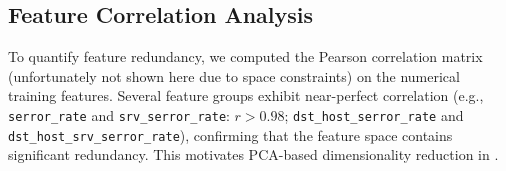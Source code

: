 \subsection{Feature Correlation Analysis} \label{sec:correlation}

    To quantify feature redundancy, we computed the Pearson correlation matrix (unfortunately not shown here due to space constraints) on the numerical training features. %
    Several feature groups exhibit near-perfect correlation (e.g., \texttt{serror\_rate} and \texttt{srv\_serror\_rate}: $r > 0.98$; \texttt{dst\_host\_serror\_rate} and \texttt{dst\_host\_srv\_serror\_rate}), confirming that the feature space contains significant redundancy.
    This motivates PCA-based dimensionality reduction in .

